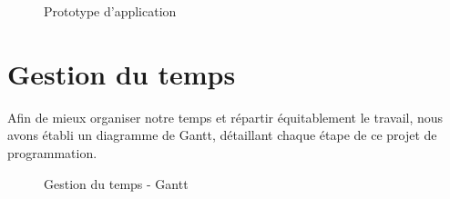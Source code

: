 \begin{figure}[!ht]
 \begin{center}
  \caption{Prototype d'application}
  \label{prototype}
 \end{center}
 \end{figure}
 
 \section{Gestion du temps}
 
 Afin de mieux organiser notre temps et répartir équitablement le travail, nous avons établi un diagramme de Gantt, détaillant chaque étape de ce projet de programmation.
 
 \begin{figure}[!ht]
 \begin{center}
  \caption{Gestion du temps - Gantt}
  \label{Gantt}
 \end{center}
 \end{figure}